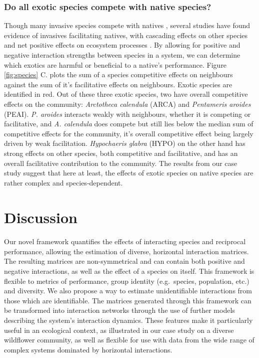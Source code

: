 \documentclass[a4,12pt]{article}
\begin{document}
    \subsubsection*{Do all exotic species compete with native species?}
    Though many invasive species compete with natives \parencite{Naeem2000, Corbin2004, Riley2008, Zheng2015}, several studies have found evidence of invasives facilitating natives, with cascading effects on other species and net positive effects on ecosystem processes \parencite{Rodriguez2006, Ramus2017}. By allowing for positive and negative interaction strengths between species in a system, we can determine which exotics are harmful or beneficial to a native's performance. Figure \ref{fig:species} C. plots the sum of a species competitive effects on neighbours against the sum of it's facilitative effects on neighbours. Exotic species are identified in red. Out of these three exotic species, two have overall competitive effects on the community: \textit{Arctotheca calendula} (ARCA) and \textit{Pentameris aroides} (PEAI). \textit{P. aroides} interacts weakly with neighbours, whether it is competing or facilitative, and \textit{A. calendula} does compete but still lies below the median sum of competitive effects for the community, it's overall competitive effect being largely driven by weak facilitation. \textit{Hypochaeris glabra} (HYPO) on the other hand has strong effects on other species, both competitive and facilitative, and has an overall facilitative contribution to the community. The results from our case study suggest that here at least, the effects of exotic species on native species are rather complex and species-dependent.

    

\section{Discussion}


    \paragraph{} 
    Our novel framework quantifies the effects of interacting species and reciprocal performance, allowing the estimation of diverse, horizontal interaction matrices. The resulting matrices are non-symmetrical and can contain both positive and negative interactions, as well as the effect of a species on itself. This framework is flexible to metrics of performance, group identity (e.g.\ species, population, etc.) and diversity. We also propose a way to estimate unidentifiable interactions from those which are identifiable. The matrices generated through this framework can be transformed into interaction networks through the use of further models describing the system's interaction dynamics. These features make it particularly useful in an ecological context, as illustrated in our case study on a diverse wildflower community, as well as flexible for use with data from the wide range of complex systems dominated by horizontal interactions.
\end{document}
